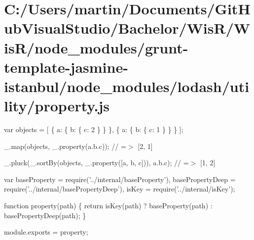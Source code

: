 \hypertarget{_c_1_2_users_2martin_2_documents_2_git_hub_visual_studio_2_bachelor_2_wis_r_2_wis_r_2node_module533d8c06b04613235215a1a48d3ce693}{}\section{C\+:/\+Users/martin/\+Documents/\+Git\+Hub\+Visual\+Studio/\+Bachelor/\+Wis\+R/\+Wis\+R/node\+\_\+modules/grunt-\/template-\/jasmine-\/istanbul/node\+\_\+modules/lodash/utility/property.\+js}
var objects = \mbox{[} \{ \textquotesingle{}a\textquotesingle{}\+: \{ \textquotesingle{}b\textquotesingle{}\+: \{ \textquotesingle{}c\textquotesingle{}\+: 2 \} \} \}, \{ \textquotesingle{}a\textquotesingle{}\+: \{ \textquotesingle{}b\textquotesingle{}\+: \{ \textquotesingle{}c\textquotesingle{}\+: 1 \} \} \} \mbox{]};

\+\_\+.\+map(objects, \+\_\+.\+property(\textquotesingle{}a.\+b.\+c\textquotesingle{})); // =$>$ \mbox{[}2, 1\mbox{]}

\+\_\+.\+pluck(\+\_\+.\+sort\+By(objects, \+\_\+.\+property(\mbox{[}\textquotesingle{}a\textquotesingle{}, \textquotesingle{}b\textquotesingle{}, \textquotesingle{}c\textquotesingle{}\mbox{]})), \textquotesingle{}a.\+b.\+c\textquotesingle{}); // =$>$ \mbox{[}1, 2\mbox{]}


\begin{DoxyCodeInclude}
var baseProperty = require(\textcolor{stringliteral}{'../internal/baseProperty'}),
    basePropertyDeep = require(\textcolor{stringliteral}{'../internal/basePropertyDeep'}),
    isKey = require(\textcolor{stringliteral}{'../internal/isKey'});

\textcolor{keyword}{function} property(path) \{
  \textcolor{keywordflow}{return} isKey(path) ? baseProperty(path) : basePropertyDeep(path);
\}

module.exports = property;
\end{DoxyCodeInclude}
 
